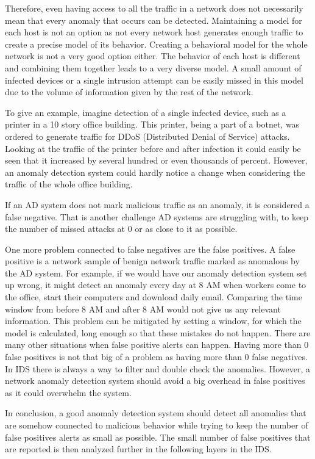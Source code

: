 \documentclass[thesis=B,english]{FITthesis}[2012/10/20]
\begin{document}
Therefore, even having access to all the traffic in a network does not necessarily mean that every anomaly that occurs can be detected.
Maintaining a model for each host is not an option as not every network host generates enough traffic to create a precise model of its behavior.
Creating a behavioral model for the whole network is not a very good option either.
The behavior of each host is different and combining them together leads to a very diverse model.
A small amount of infected devices or a single intrusion attempt can be easily missed in this model due to the volume of information given by the rest of the network.

To give an example, imagine detection of a single infected device, such as a printer in a 10 story office building.
This printer, being a part of a botnet, was ordered to generate traffic for DDoS (Distributed Denial of Service) attacks.
Looking at the traffic of the printer before and after infection it could easily be seen that it increased by several hundred or even thousands of percent.
However, an anomaly detection system could hardly notice a change when considering the traffic of the whole office building.

If an AD system does not mark malicious traffic as an anomaly, it is considered a false negative.
That is another challenge AD systems are struggling with, to keep the number of missed attacks at 0 or as close to it as possible.

One more problem connected to false negatives are the false positives.
A false positive is a network sample of benign network traffic marked as anomalous by the AD system.
For example, if we would have our anomaly detection system set up wrong, it might detect an anomaly every day at 8 AM when workers come to the office, start their computers and download daily email.
Comparing the time window from before 8 AM and after 8 AM would not give us any relevant information.
This problem can be mitigated by setting a window, for which the model is calculated, long enough so that these mistakes do not happen.
There are many other situations when false positive alerts can happen.
Having more than 0 false positives is not that big of a problem as having more than 0 false negatives.
In IDS there is always a way to filter and double check the anomalies.
However,  a network anomaly detection system should avoid a big overhead in false positives as it could overwhelm the system.

In conclusion, a good anomaly detection system should detect all anomalies that are somehow connected to malicious behavior while trying to keep the number of false positives alerts as small as possible.
The small number of false positives that are reported is then analyzed further in the following layers in the IDS.
\end{document}
